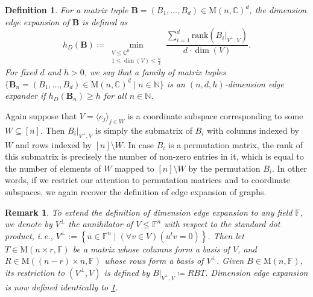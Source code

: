 \documentclass[11pt]{article}
\newtheorem{definition}[theorem]{Definition}
\newtheorem{remark}[theorem]{Remark}
\newcommand{\N}{{\mathbb N}}
\newcommand{\ie}{i.\,e.}
\theoremstyle{plain}
\numberwithin{equation}{section}
\theoremstyle{definition}
\newcommand{\F}{\mathbb{F}}
\newcommand{\bC}{\mathbb{C}}
\newcommand{\rk}{\mathrm{rank}}
\newcommand{\M}{\mathrm{M}}
\newcommand{\tuple}[1]{\mathbf{#1}}
\newcommand{\vB}{\tuple{B}}
\begin{document}
\begin{definition}\label{def:dim_edge_exp}
For a matrix tuple $\vB=(B_1, \dots, B_d)\in\M(n, \bC)^d$, the \emph{dimension edge expansion} of $\vB$ is defined as
\begin{equation}\label{eq: dim edge expansion}
    h_D(\vB)\coloneqq\min_{\substack{V \leq \bC^n\\
            1\leq\dim(V)\leq \frac n2}}\frac{\sum_{i=1}^d\rk(B_i|_{V^\perp, V})}{d\cdot\dim(V)}.
\end{equation}
For fixed $d$ and $h>0$, we say that a family of matrix tuples $\{\vB_n=(B_1, \dots, B_d)\in \M(n, \bC)^d\mid n\in \N\}$ is an \emph{$(n,d,h)$-dimension edge expander} if $h_D(\vB_n)\geq h$ for all $n\in\N$. 
\end{definition}
Again suppose that $V=\langle e_j\rangle_{j \in W}$ is a coordinate subspace corresponding to some $W \subseteq [n]$.
Then $B_i|_{V^\perp,V}$ is simply the submatrix of $B_i$ with columns indexed by $W$ and rows indexed by $[n] \setminus W$. In case $B_i$ is a permutation matrix, the rank of this submatrix is precisely the number of non-zero entries in it, which is equal to the number of elements of $W$ mapped to $[n] \setminus W$ by the permutation $B_i$. In other words, if we restrict our attention to permutation matrices and to coordinate subspaces, we again recover the definition of edge expansion of graphs.

\begin{remark}\label{rmk:def-annihilator}
  To extend the definition of dimension edge expansion to any field $\F$, we denote by $V^\perp$ the \emph{annihilator} of $V\leq \F^n$ with respect to the standard dot product, 
%
\ie,     %
%
$V^{\perp}:=\left\{u \in\mathbb{F}^n \mid (\forall v\in V)(u^t v=0)\right\}$. %
Then let $T\in \M(n\times r, \F)$ be a matrix whose columns form a basis of $V$, and $R\in \M((n-r)\times n, \F)$ whose rows form a basis of $V^\perp$. Given $B \in \M(n,\F)$, its restriction to $(V^\perp, V)$ is defined by $B|_{V^\perp, V}\coloneqq RBT$. Dimension edge expansion is now defined identically to \cref{def:dim_edge_exp}.
\end{remark}
\end{document}
